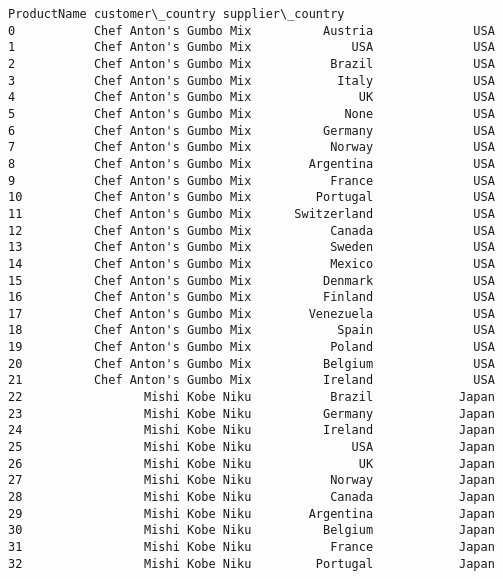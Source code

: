 \documentclass[11pt]{article}
\makeatletter
\newcommand{\boxspacing}{\kern\kvtcb@left@rule\kern\kvtcb@boxsep}
\newcommand{\prompt}[4]{
        {\ttfamily\llap{{\color{#2}[#3]:\hspace{3pt}#4}}\vspace{-\baselineskip}}
    }
\makeatother
\begin{document}
            \begin{tcolorbox}[breakable, size=fbox, boxrule=.5pt, pad at break*=1mm, opacityfill=0]
\prompt{Out}{outcolor}{41}{\boxspacing}
\begin{Verbatim}[commandchars=\\\{\}]
                       ProductName customer\_country supplier\_country
0           Chef Anton's Gumbo Mix          Austria              USA
1           Chef Anton's Gumbo Mix              USA              USA
2           Chef Anton's Gumbo Mix           Brazil              USA
3           Chef Anton's Gumbo Mix            Italy              USA
4           Chef Anton's Gumbo Mix               UK              USA
5           Chef Anton's Gumbo Mix             None              USA
6           Chef Anton's Gumbo Mix          Germany              USA
7           Chef Anton's Gumbo Mix           Norway              USA
8           Chef Anton's Gumbo Mix        Argentina              USA
9           Chef Anton's Gumbo Mix           France              USA
10          Chef Anton's Gumbo Mix         Portugal              USA
11          Chef Anton's Gumbo Mix      Switzerland              USA
12          Chef Anton's Gumbo Mix           Canada              USA
13          Chef Anton's Gumbo Mix           Sweden              USA
14          Chef Anton's Gumbo Mix           Mexico              USA
15          Chef Anton's Gumbo Mix          Denmark              USA
16          Chef Anton's Gumbo Mix          Finland              USA
17          Chef Anton's Gumbo Mix        Venezuela              USA
18          Chef Anton's Gumbo Mix            Spain              USA
19          Chef Anton's Gumbo Mix           Poland              USA
20          Chef Anton's Gumbo Mix          Belgium              USA
21          Chef Anton's Gumbo Mix          Ireland              USA
22                 Mishi Kobe Niku           Brazil            Japan
23                 Mishi Kobe Niku          Germany            Japan
24                 Mishi Kobe Niku          Ireland            Japan
25                 Mishi Kobe Niku              USA            Japan
26                 Mishi Kobe Niku               UK            Japan
27                 Mishi Kobe Niku           Norway            Japan
28                 Mishi Kobe Niku           Canada            Japan
29                 Mishi Kobe Niku        Argentina            Japan
30                 Mishi Kobe Niku          Belgium            Japan
31                 Mishi Kobe Niku           France            Japan
32                 Mishi Kobe Niku         Portugal            Japan

\end{Verbatim}
\end{tcolorbox}
\end{document}

